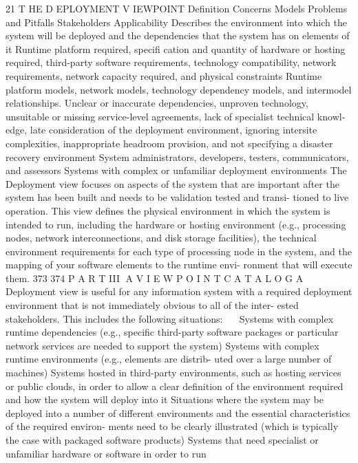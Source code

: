 21
T HE D EPLOYMENT
V IEWPOINT
Definition
Concerns
Models
Problems and
Pitfalls
Stakeholders
Applicability
Describes the environment into which the system will be deployed and
the dependencies that the system has on elements of it
Runtime platform required, specifi cation and quantity of hardware or
hosting required, third-party software requirements, technology
compatibility, network requirements, network capacity required, and
physical constraints
Runtime platform models, network models, technology dependency
models, and intermodel relationships.
Unclear or inaccurate dependencies, unproven technology, unsuitable
or missing service-level agreements, lack of specialist technical knowl-
edge, late consideration of the deployment environment, ignoring
intersite complexities, inappropriate headroom provision, and not
specifying a disaster recovery environment
System administrators, developers, testers, communicators, and assessors
Systems with complex or unfamiliar deployment environments
The Deployment view focuses on aspects of the system that are important
after the system has been built and needs to be validation tested and transi-
tioned to live operation. This view defines the physical environment in which
the system is intended to run, including the hardware or hosting environment
(e.g., processing nodes, network interconnections, and disk storage facilities),
the technical environment requirements for each type of processing node in
the system, and the mapping of your software elements to the runtime envi-
ronment that will execute them.
373
374
 P A R T III  A V I E W P O I N T C A T A L O G
A Deployment view is useful for any information system with a required
deployment environment that is not immediately obvious to all of the inter-
ested stakeholders. This includes the following situations:
Systems with complex runtime dependencies (e.g., specific third-party
software packages or particular network services are needed to support
the system)
Systems with complex runtime environments (e.g., elements are distrib-
uted over a large number of machines)
Systems hosted in third-party environments, such as hosting services or
public clouds, in order to allow a clear definition of the environment
required and how the system will deploy into it
Situations where the system may be deployed into a number of different
environments and the essential characteristics of the required environ-
ments need to be clearly illustrated (which is typically the case with
packaged software products)
Systems that need specialist or unfamiliar hardware or software in order to run
